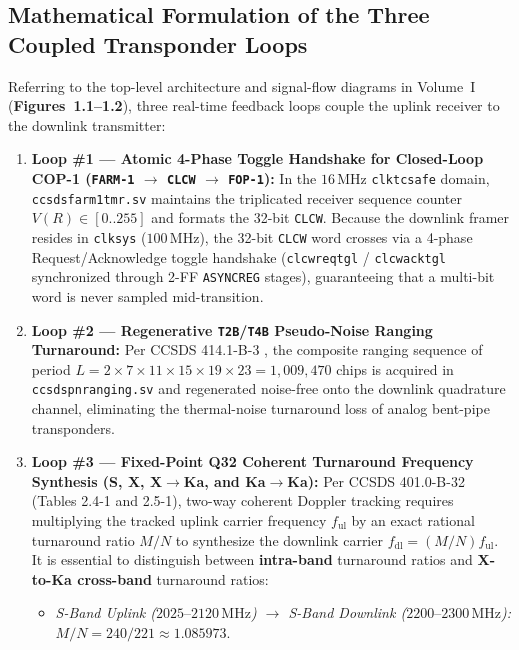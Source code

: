 \documentclass[10pt,a4paper]{article}
\renewcommand{\_}{\origunderscore\penalty0\hskip0pt\relax}
\numberwithin{equation}{section}
\numberwithin{table}{section}
\numberwithin{figure}{section}
\begin{document}
\subsection{Mathematical Formulation of the Three Coupled Transponder Loops}
Referring to the top-level architecture and signal-flow diagrams in Volume~I (\textbf{Figures~1.1--1.2}), three real-time feedback loops couple the uplink receiver to the downlink transmitter:

\begin{enumerate}\setlength{\itemsep}{2.5pt}
  \item \textbf{Loop \#1 --- Atomic 4-Phase Toggle Handshake for Closed-Loop COP-1 (\texttt{FARM-1} $\to$ \texttt{CLCW} $\to$ \texttt{FOP-1}):} In the $16\,\text{MHz}$ \texttt{clk\_tc\_safe} domain, \texttt{ccsds\_farm1\_tmr.sv} maintains the triplicated receiver sequence counter $V(R) \in [0..255]$ and formats the 32-bit \texttt{CLCW}. Because the downlink framer resides in \texttt{clk\_sys} ($100\,\text{MHz}$), the 32-bit \texttt{CLCW} word crosses via a 4-phase Request/Acknowledge toggle handshake (\texttt{clcw\_req\_tgl} / \texttt{clcw\_ack\_tgl} synchronized through 2-FF \texttt{ASYNC\_REG} stages), guaranteeing that a multi-bit word is never sampled mid-transition.
  \item \textbf{Loop \#2 --- Regenerative \texttt{T2B}/\texttt{T4B} Pseudo-Noise Ranging Turnaround:} Per CCSDS 414.1-B-3 \cite{ccsds414}, the composite ranging sequence of period $L = 2 \times 7 \times 11 \times 15 \times 19 \times 23 = 1{,}009{,}470$ chips is acquired in \texttt{ccsds\_pn\_ranging.sv} and regenerated noise-free onto the downlink quadrature channel, eliminating the thermal-noise turnaround loss of analog bent-pipe transponders.
  \item \textbf{Loop \#3 --- Fixed-Point Q32 Coherent Turnaround Frequency Synthesis (S, X, X$\to$Ka, and Ka$\to$Ka):} Per CCSDS 401.0-B-32 \cite{ccsds401} (Tables 2.4-1 and 2.5-1), two-way coherent Doppler tracking requires multiplying the tracked uplink carrier frequency $f_{\text{ul}}$ by an exact rational turnaround ratio $M/N$ to synthesize the downlink carrier $f_{\text{dl}} = (M/N) f_{\text{ul}}$. It is essential to distinguish between \textbf{intra-band} turnaround ratios and \textbf{X-to-Ka cross-band} turnaround ratios:
  \begin{itemize}\setlength{\itemsep}{1.5pt}
    \item \emph{S-Band Uplink ($2025\text{--}2120\,\text{MHz}$) $\to$ S-Band Downlink ($2200\text{--}2300\,\text{MHz}$):} $M/N = 240/221 \approx 1.085973$.

\end{itemize}
\end{enumerate}
\end{document}
